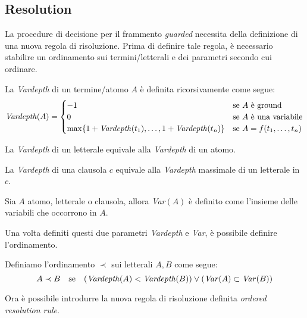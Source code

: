 \subsection{Resolution}
La procedure di decisione per il frammento \emph{guarded} necessita della definizione di una nuova regola di risoluzione.
Prima di definire tale regola, è necessario stabilire un ordinamento sui termini/letterali e dei parametri secondo cui ordinare.
\begin{definition}\label{var-def}
    La \emph{Vardepth} di un termine/atomo $A$ è definita ricorsivamente come segue:
    \[\text{\emph{Vardepth}}(A) = 
    \begin{cases}
        -1 & \text{se $A$ è ground}\\
        0 & \text{se $A$ è una variabile}\\
        \max\{1+\text{\emph{Vardepth}}(t_1), \dots, 1+\text{\emph{Vardepth}}(t_n)\} & \text{se }A=f(t_1,\dots,t_n)
    \end{cases}\]
\end{definition}
\begin{definition}
    La \emph{Vardepth} di un letterale equivale alla \emph{Vardepth} di un atomo.
\end{definition}
\begin{definition}
    La \emph{Vardepth} di una clausola $c$ equivale alla \emph{Vardepth} massimale di un letterale in $c$. 
\end{definition}
\begin{definition}
    Sia $A$ atomo, letterale o clausola, allora \emph{Var}$(A)$ è definito come l'insieme delle 
    variabili che occorrono in $A$.
\end{definition}
Una volta definiti questi due parametri \emph{Vardepth} e \emph{Var}, è possibile definire l'ordinamento.
\begin{definition}\label{ord-def}
    Definiamo l'ordinamento $\prec$ sui letterali $A,B$ come segue:
    \[A\prec B \quad\text{se}\quad(\text{\emph{Vardepth}}(A)<\text{\emph{Vardepth}}(B)) \lor (\text{\emph{Var}}(A)\subset\text{\emph{Var}}(B))\]
\end{definition}
Ora è possibile introdurre la nuova regola di risoluzione definita \emph{ordered resolution rule}.
